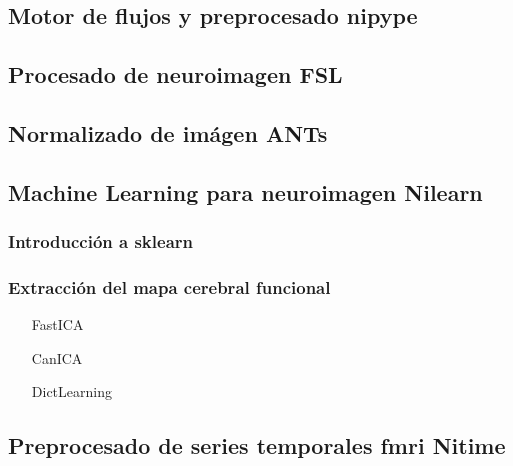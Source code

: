 \subsection{Motor de flujos y preprocesado nipype}

\subsection{Procesado de neuroimagen FSL}

\subsection{Normalizado de imágen ANTs}

\subsection{Machine Learning para neuroimagen Nilearn}

\subsubsection{Introducción a sklearn}

\subsubsection{Extracción del mapa cerebral funcional}

\begin{itemize}
\item[FastICA]
\item[CanICA]
\item[DictLearning]
\end{itemize}

\subsection{Preprocesado de series temporales fmri Nitime}

